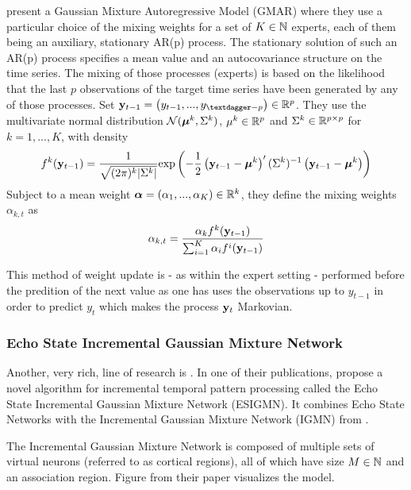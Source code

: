 \cite{Kalliovirta2015GMUnivariateSeries} present a Gaussian Mixture Autoregressive Model (GMAR) where they use a particular choice of the mixing weights for a set of $K \in \mathbb{N}$ experts, each of them being an auxiliary, stationary AR(p) process. The stationary solution of such an AR(p) process specifies a mean value and an autocovariance structure on the time series. The mixing of those processes (experts) is based on the likelihood that the last $p$ observations of the target time series have been generated by any of those processes. Set ${\bf y}_{t-1} = \left(y_{t-1},...,y_{†-p}\right) \in \R^{p}$. They use the multivariate normal distribution $\mathcal{N}({{\bm \mu}}^{k}, \Sigma^{k})$, $\mu^{k} \in \mathbb{R}^{p}$ and $\Sigma^{k} \in \mathbb{R}^{p\times{}p}$ for $k = 1, ..., K$, with density
\begin{equation}
    f^{k}({\bf y}_{t-1}) = \frac{1}{\sqrt{(2\pi)^k \vert \Sigma^{k} \vert}} \text{exp}\left(-\frac{1}{2}\left({\bf y}_{t-1}-{{\bm \mu}}^{k}\right)'(\Sigma^{k})^{-1}\left({\bf y}_{t-1}-{{\bm \mu}}^{k}\right)\right)
\end{equation}
Subject to a mean weight ${{\bm \alpha}} = \left(\alpha_1, ..., \alpha_K\right) \in \mathbb{R}^{k}$, they define the mixing weights $\alpha_{k,t}$ as
\begin{equation}
    \alpha_{k,t} = \frac{\alpha_k f^{k}({\bf y}_{t-1})}{\sum_{i=1}^{K} \alpha_i f^{i}({\bf y}_{t-1})}
\end{equation}

This method of weight update is - as within the expert setting - performed before the predition of the next value as one has uses the observations up to $y_{t-1}$ in order to predict $y_t$ which makes the process ${\bf y}_t$ Markovian.

\subsubsection{Echo State Incremental Gaussian Mixture Network}
\label{CH:ExpertModels:ESIGMN}

Another, very rich, line of research is \citep{Engel2010IncrementalGaussianMixtures, Heinen2011IGMN, Heinen2011ACA}. In one of their publications, \cite{ESIGM2011} propose a novel algorithm for incremental temporal pattern processing called the Echo State Incremental Gaussian Mixture Network (ESIGMN). It combines Echo State Networks with the Incremental Gaussian Mixture Network (IGMN) from \cite{Heinen2011IGMN}. 

The Incremental Gaussian Mixture Network is composed of multiple sets of virtual neurons (referred to as cortical regions), all of which have size $M \in \mathbb{N}$ and an association region. Figure  from their paper visualizes the model. 

